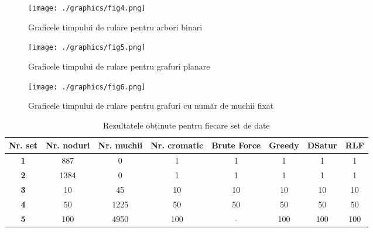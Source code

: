\documentclass[runningheads]{paper}
\begin{document}
\begin{figure}[!]
\centering
\texttt{[image: ./graphics/fig4.png]}
\caption{Graficele timpului de rulare pentru arbori binari}
\label{fig:binary_tree_graphs}
\end{figure}

\begin{figure}[!]
\centering
\texttt{[image: ./graphics/fig5.png]}
\caption{Graficele timpului de rulare pentru grafuri planare}
\label{fig:planar_graphs}
\end{figure}

\begin{figure}[!]
\centering
\texttt{[image: ./graphics/fig6.png]}
\caption{Graficele timpului de rulare pentru grafuri cu număr de muchii fixat}
\label{fig:fixed_edge_number_graphs}
\end{figure}

\begin{table}[!]
\centering
\caption{Rezultatele obținute pentru fiecare set de date}
\label{tab:results}
\begin{tabular}{|c|c|c|c|c|c|c|c|}
\hline
\textbf{Nr. set} & \textbf{Nr. noduri} & \textbf{Nr. muchii} & \textbf{Nr. cromatic} & \textbf{Brute Force} & \textbf{Greedy} & \textbf{DSatur} & \textbf{RLF} \\ \hline
\textbf{1} & 887 & 0 & 1 & 1 & 1 & 1 & 1 \\ \hline 
\textbf{2} & 1384 & 0 & 1 & 1 & 1 & 1 & 1 \\ \hline
\textbf{3} & 10 & 45 & 10 & 10 & 10 & 10 & 10 \\ \hline 
\textbf{4} & 50 & 1225 & 50 & 50 & 50 & 50 & 50 \\ \hline 
\textbf{5} & 100 & 4950 & 100 & - & 100 & 100 & 100 \\ \hline 
\end{tabular}
\end{table}
\end{document}
